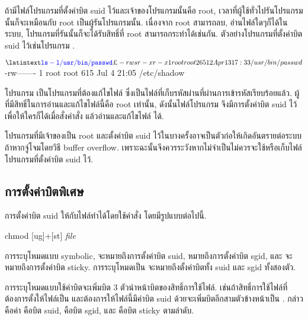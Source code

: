 \begin{thwbr}
ถ้ามีไฟล์โปรแกรมที่ตั้งค่าบิต suid ไว้และเจ้าของโปรแกรมนั้นคือ root, เวลาที่ผู้ใช้ทั่วไปรันโปรแกรมนั้นก็จะเหมือนกับ root เป็นผู้รันโปรแกรมนั้น. เนื่องจาก root สามารถลบ, อ่านไฟล์ใดๆก็ได้ในระบบ, โปรแกรมที่รันนั้นก็จะได้รับสิทธิ์ที่ root สามารถกระทำได้เช่นกัน. ตัวอย่างโปรแกรมที่ตั้งค่าบิต suid ไว้เช่นโปรแกรม . 

\begin{MyExample}
\begin{MyEx}
$ \cin{ls -l /usr/bin/passwd}
-rwsr-xr-x    1 root     root        26512 Apr 13 17:33 /usr/bin/passwd
$ 
-rw-------    1 root     root          615 Jul  4 21:05 /etc/shadow
\end{MyEx}
\end{MyExample}
โปรแกรม  เป็นโปรแกรมที่ต้องแก้ไขไฟล์  ซึ่งเป็นไฟล์ที่เก็บรหัสผ่านที่ผ่านการเข้ารหัสเรียบร้อยแล้ว. ผู้ที่มีสิทธิ์ในการอ่านและแก้ไขไฟล์นี้คือ root เท่านั้น, ดังนั้นไฟล์โปรแกรม  จึงมีการตั้งค่าบิต suid ไว้เพื่อให้ใครก็ได้เมื่อสั่งคำสั่ง  แล้วอ่านและแก้ไขไฟล์  ได้.


โปรแกรมที่มีเจ้าของเป็น root และตั้งค่าบิต suid ไว้ในบางครั้งอาจเป็นตัวก่อให้เกิดอันตรายต่อระบบถ้าหากจู่โจมโดยวิธี buffer overflow. เพราะฉะนั้นจึงควรระวังหากไม่จำเป็นไม่ควรจะใช้หรือเก็บไฟล์โปรแกรมที่ตั้งค่าบิต suid ไว้.


\subsection{การตั้งค่าบิตพิเศษ}
การตั้งค่าบิต suid ให้กับไฟล์ทำได้โดยใช้คำสั่ง  โดยมีรูปแบบต่อไปนี้.
\begin{MyVerbatim}
 chmod [ug]+[st] \textit{file}
\end{MyVerbatim}
การระบุโหมดแบบ symbolic,  จะหมายถึงการตั้งค่าบิต suid,  หมายถึงการตั้งค่าบิต sgid, และ  จะหมายถึงการตั้งค่าบิต sticky. การระบุโหมดเป็น  จะหมายถึงตั้งค่าบิตทั้ง suid และ sgid ทั้งสองตัว.

การระบุโหมดแบบใช้ค่าบิตจะเพิ่มบิต 3 ตัวนำหน้าบิตของสิทธิ์การใช้ไฟล์. เช่นถ้าสิทธิ์การใช้ไฟล์ที่ต้องการตั้งให้ไฟล์เป็น  และต้องการให้ไฟล์นี้มีค่าบิต suid ด้วยจะเพิ่มบิตอีกสามตัวข้างหน้าเป็น . กล่าวคือค่า  คือบิต suid,  คือบิต sgid, และ  คือบิต sticky ตามลำดับ. 







\end{thwbr}
